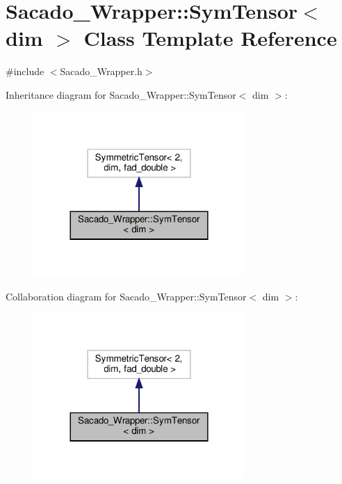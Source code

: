 \hypertarget{classSacado__Wrapper_1_1SymTensor}{}\section{Sacado\+\_\+\+Wrapper\+:\+:Sym\+Tensor$<$ dim $>$ Class Template Reference}
\label{classSacado__Wrapper_1_1SymTensor}


{\ttfamily \#include $<$Sacado\+\_\+\+Wrapper.\+h$>$}



Inheritance diagram for Sacado\+\_\+\+Wrapper\+:\+:Sym\+Tensor$<$ dim $>$\+:\nopagebreak
\begin{figure}[H]
\begin{center}
\leavevmode
\includegraphics[width=228pt]{classSacado__Wrapper_1_1SymTensor__inherit__graph}
\end{center}
\end{figure}


Collaboration diagram for Sacado\+\_\+\+Wrapper\+:\+:Sym\+Tensor$<$ dim $>$\+:\nopagebreak
\begin{figure}[H]
\begin{center}
\leavevmode
\includegraphics[width=228pt]{classSacado__Wrapper_1_1SymTensor__coll__graph}
\end{center}
\end{figure}

